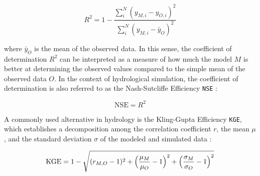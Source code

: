 \documentclass[./main_en.tex]{subfiles}
\begin{document}
\begin{linenomath*}
\begin{equation} 
	\label{eq:r2}
 R^2 = 1 - \frac{\sum_{i}^{N} (y_{M, i} - y_{O, i})^2}{\sum_{i}^{N} (y_{M, i} - \bar{y}_{O})^2}
\end{equation}
\end{linenomath*}
where $\bar{y}_{O}$ is the mean of the observed data. In this sense, the coefficient of determination $R^2$ can be interpreted as a measure of how much the \gls{model} $M$ is better at determining the observed values compared to the simple mean of the observed data $O$. In the context of hydrological simulation, the coefficient of determination is also referred to as the Nash-Sutcliffe Efficiency \texttt{NSE} \cite{Nash1970}:
\begin{linenomath*}
\begin{equation} 
	\label{eq:nse}
 \text{NSE} = R^2
\end{equation}
\end{linenomath*}
A commonly used alternative in \gls{hydrology} is the Kling-Gupta Efficiency \texttt{KGE}, which establishes a decomposition among the correlation coefficient $r$, the mean $\mu$, and the standard deviation $\sigma$ of the modeled and simulated data \cite{Gupta2009}:
\begin{linenomath*}
\begin{equation} 
	\label{eq:kge}
 \text{KGE} = 1 - \sqrt{(r_{M,O} - 1)^2 + \Big{(}\frac{\mu_M}{\mu_O} - 1\Big{)}^2 + \Big{(}\frac{\sigma_M}{\sigma_O} - 1\Big{) }^2 } 
\end{equation}
\end{linenomath*}
\end{document}
